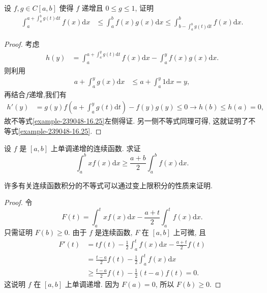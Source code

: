 \documentclass[../../main.tex]{subfiles}
\begin{document}
\begin{example}
设 $f,g \in C[a,b]$ 使得 $f$ 递增且 $0 \leqslant g \leqslant 1$, 证明
\begin{align}\label{example-239048-16.25}
\int_{a}^{a + \int_{a}^{b}g(t)\mathrm{d}t}f(x)\mathrm{d}x &\leqslant \int_{a}^{b}f(x)g(x)\mathrm{d}x \leqslant \int_{b - \int_{a}^{b}g(t)\mathrm{d}t}^{b}f(x)\mathrm{d}x.
\end{align}
\end{example}
\begin{proof}
考虑
\begin{align*}
h(y) &= \int_{a}^{a + \int_{a}^{y}g(t)\mathrm{d}t}f(x)\mathrm{d}x - \int_{a}^{y}f(x)g(x)\mathrm{d}x.
\end{align*}
则利用
\begin{align*}
a + \int_{a}^{y}g(x)\mathrm{d}x &\leqslant a + \int_{a}^{y}1\mathrm{d}x = y,
\end{align*}
再结合$f$递增,我们有
\begin{align*}
h'(y) &= g(y)f\left(a + \int_{a}^{y}g(t)\mathrm{d}t\right) - f(y)g(y) \leqslant 0 \to h(b) \leqslant h(a) = 0,
\end{align*}
故不等式\eqref{example-239048-16.25}左侧得证. 另一侧不等式同理可得, 这就证明了不等式\eqref{example-239048-16.25}. 
\end{proof}

\begin{proposition}
设 $f$ 是 $[a,b]$ 上单调递增的连续函数. 求证
$$\int_a^b xf(x)\mathrm{d}x\geqslant \frac{a+b}{2}\int_a^b f(x)\mathrm{d}x.$$
\end{proposition}
\begin{note}
许多有关连续函数积分的不等式可以通过变上限积分的性质来证明.
\end{note}
\begin{proof}
令
$$F(t)=\int_a^t xf(x)\mathrm{d}x-\frac{a+t}{2}\int_a^t f(x)\mathrm{d}x.$$
只需证明 $F(b)\geqslant 0$. 由于 $f$ 是连续函数, $F$ 在 $[a,b]$ 上可微, 且
$$
\begin{aligned}
F'(t) &= tf(t)-\frac{1}{2}\int_a^t f(x)\mathrm{d}x-\frac{a+t}{2}f(t) \\
&= \frac{t-a}{2}f(t)-\frac{1}{2}\int_a^t f(x)\mathrm{d}x \\
&\geqslant  \frac{t-a}{2}f(t)-\frac{1}{2}(t-a)f(t)=0.
\end{aligned}
$$
这说明 $f$ 在 $[a,b]$ 上单调递增. 因为 $F(a)=0$, 所以 $F(b)\geqslant 0$.
\end{proof}
\end{document}

